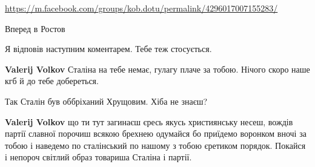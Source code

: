 \begin{itemize}
\url{https://m.facebook.com/groups/kob.dotu/permalink/4296017007155283/}

 
Вперед в Ростов

\begin{itemize}
 
Я відповів наступним коментарем.
Тебе теж стосується.

 
\textbf{Valerij Volkov} Сталіна на тебе немає, гулагу плаче за тобою. Нічого скоро наше кгб й до тебе добереться.

 
Так Сталін був оббріханий Хрущовим.
Хіба не знаєш?

 
\textbf{Valerij Volkov} що ти тут загинаєш єресь якусь християнську несеш, вождів партії славної порочиш всякою брехнею одумайся бо приїдемо воронком вночі за тобою і наведемо по сталінський по нашому з тобою єретиком порядок. Покайся і непороч світлий образ товариша Сталіна і партії.

 

\end{itemize}
\end{itemize}
